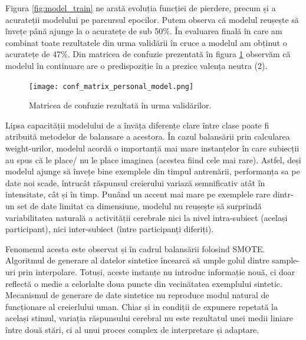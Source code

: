 Figura \ref{fig:model_train} ne arată evoluția funcției de pierdere, precum și a acurateții modelului pe parcursul epocilor. Putem observa că modelul reușește să învețe până ajunge la o acuratețe de sub 50\%. În evaluarea finală în care am combinat toate rezultatele din urma validării în cruce a modelul am obținut o acuratețe de 47\%. Din matricea de confuzie prezentată în figura \ref{fig:conf_matrix} observăm că modelul în continuare are o predispoziție în a prezice valența neutra (2).

\begin{figure}[H]
    \centering
		\vspace{-1em}
    \texttt{[image: conf\_matrix\_personal\_model.png]}
    \caption{Matricea de confuzie rezultată în urma validărilor.}
		\vspace{-1em}
    \label{fig:conf_matrix}
\end{figure}

Lipsa capacității modelului de a învăța diferențe clare între clase poate fi atribuită metodelor de balansare a acestora. În cazul balansării prin calcularea weight-urilor, modelul acordă o importanță mai mare instanțelor în care subiecții au spus că le place/ nu le place imaginea (acestea fiind cele mai rare). Astfel, deși modelul ajunge să învețe bine exemplele din timpul antrenării, performanța sa pe date noi scade, întrucât răspunsul creierului variază semnificativ atât în intensitate, cât și în timp. Punând un accent mai mare pe exemplele rare dintr-un set de date limitat ca dimensiune, modelul nu reușește să surprindă variabilitatea naturală a activității cerebrale nici la nivel intra-subiect (același participant), nici inter-subiect (între participanți diferiți).


Fenomenul acesta este observat și în cadrul balansării folosind SMOTE\cite{imblearn}. Algoritmul de generare al datelor sintetice încearcă să umple golul dintre sample-uri prin interpolare. Totuși, aceste instanțe nu introduc informație nouă, ci doar reflectă o medie a celorlalte doua puncte din vecinătatea exemplului sintetic. Mecanismul de generare de date sintetice nu reproduce modul natural de funcționare al creierlului uman. Chiar și in condiții de expunere repetată la același stimul, variația răspunsului cerebral nu este rezultatul unei medii liniare între două stări, ci al unui proces complex de interpretare și adaptare.
